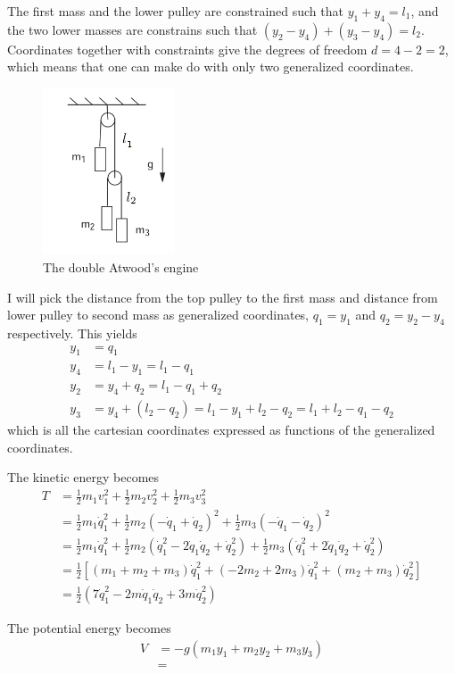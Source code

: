 \documentclass[11pt]{amsart}
\begin{document}
The first mass and the lower pulley are constrained such that $y_1 + y_4 = l_1$, and the two lower masses are constrains such that $(y_2 - y_4) + (y_3 - y_4) = l_2$. Coordinates together with constraints give the degrees of freedom $d = 4 - 2 = 2$, which means that one can make do with only two generalized coordinates.

\begin{figure}
	\centering
	\includegraphics[width = 0.35\textwidth]{./figures/problem2.png}
	\caption{The double Atwood's engine}
	\label{fig:atwood}
\end{figure}

I will pick the distance from the top pulley to the first mass and distance from lower pulley to second mass as generalized coordinates, $q_1=y_1$ and $q_2 = y_2 - y_4$ respectively. This yields 
\begin{align*}
y_1 &= q_1 \\ 
y_4 &= l_1 - y_1 = l_1 - q_1 \\
y_2 &= y_4 + q_2 = l_1 - q_1 + q_2 \\
y_3 &= y_4 + (l_2 - q_2) = l_1 - y_1 + l_2 - q_2 = l_1 + l_2 - q_1 - q_2 
\end{align*}
which is all the cartesian coordinates expressed as functions of the generalized coordinates.

The kinetic energy becomes
\begin{align*}
T 	&= \frac{1}{2}m_1v_1^2 + \frac{1}{2}m_2v_2^2 + \frac{1}{2}m_3v_3^2 \\
	&= \frac{1}{2}m_1\dot{q}_1^2 + \frac{1}{2}m_2(-\dot{q}_1 + \dot{q}_2)^2 + \frac{1}{2}m_3(-\dot{q}_1 - \dot{q}_2)^2 \\
	&= \frac{1}{2}m_1\dot{q}_1^2 + \frac{1}{2}m_2(\dot{q}_1^2 -2\dot{q}_1\dot{q}_2 + \dot{q}_2^2) + \frac{1}{2}m_3(\dot{q}_1^2 + 2\dot{q}_1\dot{q}_2 + \dot{q}_2^2) \\
	&= \frac{1}{2}[ (m_1 + m_2 + m_3)\dot{q}_1^2 + (-2m_2 + 2m_3)\dot{q}_1^2 + (m_2+m_3)\dot{q}_2^2 ] \\
	&= \frac{1}{2}( 7 \dot{q}_1^2 - 2m\dot{q}_1\dot{q}_2 + 3m\dot{q}_2^2)
\end{align*}

The potential energy becomes
\begin{align*}
V 	&= -g( m_1y_1 + m_2y_2 + m_3y_3 ) \\
	&= 
\end{align*}
\end{document}
